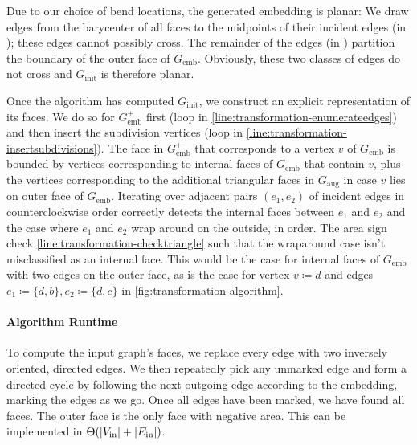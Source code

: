 Due to our choice of bend locations, the generated embedding is planar: We draw edges from the barycenter of all faces to the midpoints of their incident edges (in ); these edges cannot possibly cross. The remainder of the edges (in ) partition the boundary of the outer face of $G_\text{emb}$. Obviously, these two classes of edges do not cross and $G_\text{init}$ is therefore planar.

Once the algorithm has computed $G_\text{init}$, we construct an explicit representation of its faces. We do so for $G_\text{emb}^+$ first (loop in \cref{line:transformation-enumerateedges}) and then insert the subdivision vertices (loop in \cref{line:transformation-insertsubdivisions}). The face in $G_\text{emb}^+$ that corresponds to a vertex $v$ of $G_\text{emb}$ is bounded by vertices corresponding to internal faces of $G_\text{emb}$ that contain $v$, plus the vertices corresponding to the additional triangular faces in $G_\text{aug}$ in case $v$ lies on outer face of $G_\text{emb}$. Iterating over adjacent pairs $(e_1, e_2)$ of incident edges in counterclockwise order correctly detects the internal faces between $e_1$ and $e_2$ and the case where $e_1$ and $e_2$ wrap around on the outside, in order. The area sign check \cref{line:transformation-checktriangle} such that the wraparound case isn't misclassified as an internal face. This would be the case for internal faces of $G_\text{emb}$ with two edges on the outer face, as is the case for vertex $v \coloneqq d$ and edges $e_1 \coloneqq \{d,b\}, e_2 \coloneqq \{d,c\}$ in \cref{fig:transformation-algorithm}.



\paragraph{Algorithm Runtime}

To compute the input graph's faces, we replace every edge with two inversely oriented, directed edges. We then repeatedly pick any unmarked edge and form a directed cycle by following the next outgoing edge according to the embedding, marking the edges as we go. Once all edges have been marked, we have found all faces. The outer face is the only face with negative area. This can be implemented in $\Theta(\left\lvert V_\text{in}\right\rvert + \left\lvert E_\text{in}\right\rvert)$.

